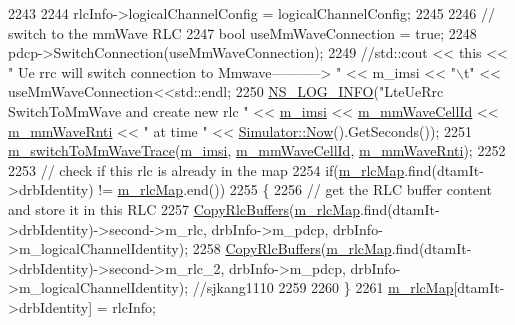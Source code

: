 \begin{DoxyCode}
2243 
2244               rlcInfo->logicalChannelConfig = logicalChannelConfig;
2245 
2246               \textcolor{comment}{// switch to the mmWave RLC}
2247               \textcolor{keywordtype}{bool} useMmWaveConnection = \textcolor{keyword}{true};
2248               pdcp->SwitchConnection(useMmWaveConnection);
2249               \textcolor{comment}{//std::cout << this << " Ue rrc will switch connection to Mmwave-----------> " << m\_imsi <<
       "\(\backslash\)t" << useMmWaveConnection<<std::endl;}
2250               \hyperlink{group__logging_gafbd73ee2cf9f26b319f49086d8e860fb}{NS\_LOG\_INFO}(\textcolor{stringliteral}{"LteUeRrc SwitchToMmWave and create new rlc "} << 
      \hyperlink{classns3_1_1LteUeRrc_a1d825677309d17bdf729920f7dafd011}{m\_imsi} << \hyperlink{classns3_1_1LteUeRrc_a28b83564a465159f0cf6d75d4b48d7eb}{m\_mmWaveCellId} << \hyperlink{classns3_1_1LteUeRrc_a0bd0d5c3b49624be1fd217f96910f56a}{m\_mmWaveRnti} << \textcolor{stringliteral}{" at time "} << 
      \hyperlink{classns3_1_1Simulator_ac3178fa975b419f7875e7105be122800}{Simulator::Now}().GetSeconds());
2251               \hyperlink{classns3_1_1LteUeRrc_a7639b7deb1468b3ba98c4c8731832597}{m\_switchToMmWaveTrace}(\hyperlink{classns3_1_1LteUeRrc_a1d825677309d17bdf729920f7dafd011}{m\_imsi}, 
      \hyperlink{classns3_1_1LteUeRrc_a28b83564a465159f0cf6d75d4b48d7eb}{m\_mmWaveCellId}, \hyperlink{classns3_1_1LteUeRrc_a0bd0d5c3b49624be1fd217f96910f56a}{m\_mmWaveRnti});
2252 
2253               \textcolor{comment}{// check if this rlc is already in the map}
2254               \textcolor{keywordflow}{if}(\hyperlink{classns3_1_1LteUeRrc_a64b3948cda818827b8774d7a2be7ea4f}{m\_rlcMap}.find(dtamIt->drbIdentity) != \hyperlink{classns3_1_1LteUeRrc_a64b3948cda818827b8774d7a2be7ea4f}{m\_rlcMap}.end())
2255               \{
2256                 \textcolor{comment}{// get the RLC buffer content and store it in this RLC}
2257                 \hyperlink{classns3_1_1LteUeRrc_a16b7f4ca06cba845c7af6bb37670242e}{CopyRlcBuffers}(\hyperlink{classns3_1_1LteUeRrc_a64b3948cda818827b8774d7a2be7ea4f}{m\_rlcMap}.find(dtamIt->drbIdentity)->second->m\_rlc, 
      drbInfo->m\_pdcp, drbInfo->m\_logicalChannelIdentity);
2258                 \hyperlink{classns3_1_1LteUeRrc_a16b7f4ca06cba845c7af6bb37670242e}{CopyRlcBuffers}(\hyperlink{classns3_1_1LteUeRrc_a64b3948cda818827b8774d7a2be7ea4f}{m\_rlcMap}.find(dtamIt->drbIdentity)->second->m\_rlc\_2, 
      drbInfo->m\_pdcp, drbInfo->m\_logicalChannelIdentity); \textcolor{comment}{//sjkang1110}
2259 
2260               \} 
2261               \hyperlink{classns3_1_1LteUeRrc_a64b3948cda818827b8774d7a2be7ea4f}{m\_rlcMap}[dtamIt->drbIdentity] = rlcInfo;  

\end{DoxyCode}
